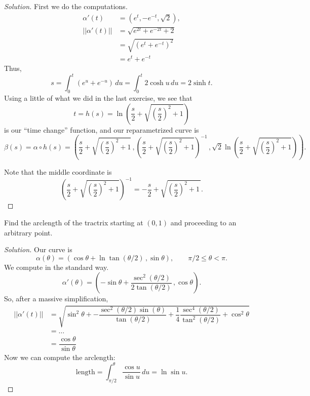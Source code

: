 \documentclass[Shifrin_Solutions_Spring_2015]{subfiles}
\begin{document}
\begin{proof}[Solution]
First we do the computations.
\begin{align*}
\alpha'(t) & = \left( e^t , -e^{-t} , \sqrt{2} \right) , \\
||\alpha'(t) || & =\sqrt{ e^{2t} + e^{-2t} + 2} \\
& = \sqrt{( e^t + e^{-t}  )^2} \\
& = e^t + e^{-t}
\end{align*}
Thus,
\[
s = \int_0^t (e^u + e^{-u} ) \, du = \int_0^t 2\cosh u \, du = 2 \sinh t.
\]
Using a little of what we did in the last exercise, we see that
\[
t = h(s) = \ln\left( \dfrac{s}{2} + \sqrt{\left(\dfrac{s}{2}\right)^2 + 1 } \right)
\]
is our ``time change'' function, and our reparametrized curve is
\[
\beta(s) = \alpha\circ h(s) = \left(
 \dfrac{s}{2} + \sqrt{\left(\dfrac{s}{2}\right)^2 + 1 } \, ,
\left( \dfrac{s}{2} + \sqrt{\left(\dfrac{s}{2}\right)^2 + 1 }\right)^{-1} \, ,
\sqrt{2}\ln\left(\dfrac{s}{2} + \sqrt{ \left(\dfrac{s}{2}\right)^2+1 } \right) \right) .
\]

Note that the middle coordinate is
\[
\left(\dfrac{s}{2} + \sqrt{\left(\dfrac{s}{2}\right)^2 + 1 }\right)^{-1} =  - \dfrac{s}{2} + \sqrt{\left(\dfrac{s}{2}\right)^2 + 1\, }  .
\]

\end{proof}

\vspace{.5cm}



\begin{exercise}
Find the arclength of the tractrix starting at $(0,1)$ and proceeding to an arbitrary point.
\end{exercise}

\begin{proof}[Solution]
Our curve is
\[
\alpha(\theta) = \left( \cos \theta + \ln \tan( \theta/2 )\, , \sin\theta \right) , \qquad \pi/2 \leq \theta < \pi .
\]
We compute in the standard way.
\[
\alpha'(\theta) = \left( -\sin\theta + \dfrac{\sec^2(\theta/2)}{2\tan(\theta/2)}\, , \cos\theta \right) .
\]
So, after a massive simplification,
\[
\begin{split}
||\alpha'(t) ||  & = \sqrt{  \sin^2\theta + -\dfrac{\sec^2(\theta/2)\sin(\theta)}{\tan(\theta/2)} + \dfrac{1}{4}\dfrac{\sec^4(\theta/2)}{\tan^2(\theta/2)} + \cos^2\theta   } \\
& = \ldots \\
& =   \dfrac{\cos \theta}{\sin\theta}
\end{split}
\]
Now we can compute the arclength:
\[
\text{length} = \int_{\pi/2}^{\theta} \dfrac{\cos u}{\sin u} \, du = \ln \sin u .
\]
\end{proof}
\end{document}
